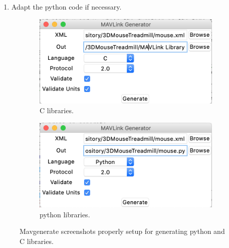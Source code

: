 \documentclass[12pt,a4paper, twoside]{article}
\begin{document}
\begin{enumerate}
\begin{enumerate}
\begin{itemize}
		\end{itemize}
		Now you can press on generate.
		The GUI should be similar to figure \ref{fig:gen_py}.
		If some errors are shown, correct them and try again.
		\item Change directory to the parent one
		\begin{lstlisting}[style = Bashstyle]
		$ cd ../
		\end{lstlisting}
		\item repeat the installation guide (see \ref{sec:install}) from point 3. 
	\end{enumerate}
	\item Adapt the python code if necessary. 	
\end{enumerate}
\begin{figure}[H]
	\centering
	\begin{subfigure}[b]{0.4\textwidth}
		\includegraphics[width=\textwidth]{fig/gen_c}
		\caption{C libraries.}
		\label{fig:gen_c}
	\end{subfigure}
	\begin{subfigure}[b]{0.4\textwidth}
	 	\includegraphics[width=\textwidth]{fig/gen_py}
		\caption{python libraries.}
		\label{fig:gen_py}
	\end{subfigure}
	\caption[Mavgenerate screenshots]{Mavgenerate screenshots properly setup for generating python and C libraries.}
\end{figure}
\end{document}
